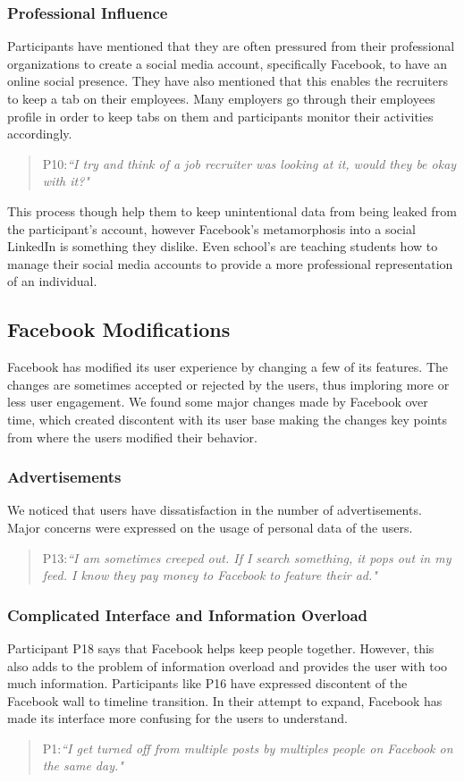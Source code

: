 \subsubsection{Professional Influence}
Participants have mentioned that they are often pressured from their professional organizations to create a social media account, specifically Facebook, to have an online social presence. They have also mentioned that this enables the recruiters to keep a tab on their employees. Many employers go through their employees profile in order to keep tabs on them and participants monitor their activities accordingly.
\begin{quote}
P10:\textit{``I try and think of a job recruiter was looking at it, would they be okay with it?"}
\end{quote}
This process though help them to keep unintentional data from being leaked from the participant's account, however Facebook's metamorphosis into a social LinkedIn is something they dislike. Even school's are teaching students how to manage their social media accounts to provide a more professional representation of an individual.

\subsection{Facebook Modifications}
Facebook has modified its user experience by changing a few of its features. The changes are sometimes accepted or rejected by the users, thus imploring more or less user engagement. We found some major changes made by Facebook over time, which created discontent with its user base making the changes key points from where the users modified their behavior.

\subsubsection{Advertisements}
We noticed that users have dissatisfaction in the number of advertisements. Major concerns were expressed on the usage of personal data of the users. 
\begin{quote}
P13:\textit{``I am sometimes creeped out. If I search something, it pops out in my feed. I know they pay money to Facebook to feature their ad."}
\end{quote}

\subsubsection{Complicated Interface and Information Overload}
Participant P18 says that Facebook helps keep people together. However, this also adds to the problem of information overload and provides the user with too much information. Participants like P16 have expressed discontent of the Facebook wall to timeline transition. In their attempt to expand, Facebook has made its interface more confusing for the users to understand. 
\begin{quote}
P1:\textit{``I get turned off from multiple posts by multiples people on Facebook on the same day."}
\end{quote}

